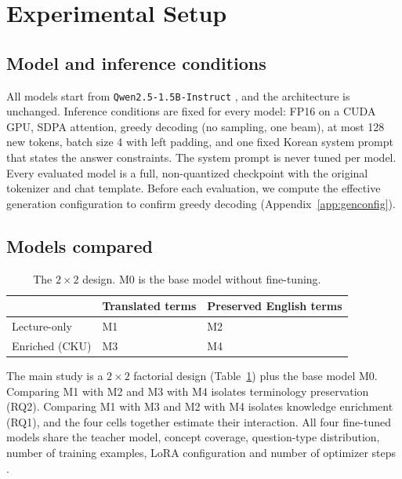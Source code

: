 \section{Experimental Setup}
\label{sec:setup}

\subsection{Model and inference conditions}
\label{sec:setup-inference}

All models start from \texttt{Qwen2.5-1.5B-Instruct} , and the architecture is unchanged.
Inference conditions are fixed for every model: FP16 on a CUDA GPU, SDPA attention, greedy decoding (no sampling, one beam), at most 128 new tokens, batch size 4 with left padding, and one fixed Korean system prompt that states the answer constraints.
The system prompt is never tuned per model.
Every evaluated model is a full, non-quantized checkpoint with the original tokenizer and chat template.
Before each evaluation, we compute the effective generation configuration to confirm greedy decoding (Appendix~\ref{app:genconfig}).

\subsection{Models compared}
\label{sec:setup-design}

\begin{table}[t]
\centering
\small
\begin{tabular}{lll}
\toprule
 & Translated terms & Preserved English terms \\
\midrule
Lecture-only & M1 & M2 \\
Enriched (CKU) & M3 & M4 \\
\bottomrule
\end{tabular}
\caption{The $2\times2$ design. M0 is the base model without fine-tuning.}
\label{tab:design}
\end{table}

The main study is a $2\times2$ factorial design (Table~\ref{tab:design}) plus the base model M0.
Comparing M1 with M2 and M3 with M4 isolates terminology preservation (RQ2).
Comparing M1 with M3 and M2 with M4 isolates knowledge enrichment (RQ1), and the four cells together estimate their interaction.
All four fine-tuned models share the teacher model, concept coverage, question-type distribution, number of training examples, LoRA configuration and number of optimizer steps .

